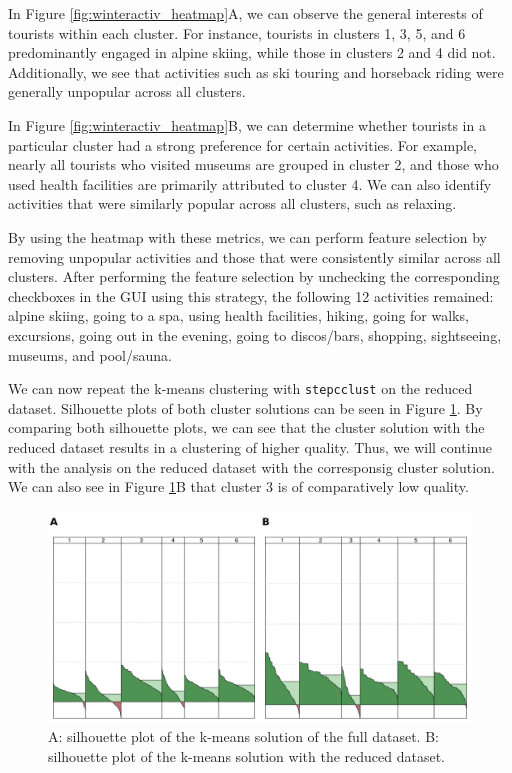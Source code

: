 \documentclass[article]{ajs}
\begin{document}
In Figure \ref{fig:winteractiv_heatmap}A, we can observe the general interests of tourists within each cluster. For instance, tourists in clusters 1, 3, 5, and 6 predominantly engaged in alpine skiing, while those in clusters 2 and 4 did not. Additionally, we see that activities such as ski touring and horseback riding were generally unpopular across all clusters.

In Figure \ref{fig:winteractiv_heatmap}B, we can determine whether tourists in a particular cluster had a strong preference for certain activities. For example, nearly all tourists who visited museums are grouped in cluster 2, and those who used health facilities are primarily attributed to cluster 4. We can also identify activities that were similarly popular across all clusters, such as relaxing.

By using the heatmap with these metrics, we can perform feature selection by removing unpopular activities and those that were consistently similar across all clusters. After performing the feature selection by unchecking the corresponding checkboxes in the GUI using this strategy, the following 12 activities remained: alpine skiing, going to a spa, using health facilities, hiking, going for walks, excursions, going out in the evening, going to discos/bars, shopping, sightseeing, museums, and pool/sauna.

We can now repeat the k-means clustering with \texttt{stepcclust} on the reduced dataset. Silhouette plots of both cluster solutions can be seen in Figure \ref{fig:silhouette_comparison}. By comparing both silhouette plots, we can see that the cluster solution with the reduced dataset results in a clustering of higher quality. Thus, we will continue with the analysis on the reduced dataset with the corresponsig cluster solution. We can also see in Figure \ref{fig:silhouette_comparison}B that cluster 3 is of comparatively low quality.

\begin{figure}[h!]
    \centering
    \includegraphics[width=1\textwidth]{silhouette_comparison.png}
    \caption{A: silhouette plot of the k-means solution of the full dataset. B: silhouette plot of the k-means solution with the reduced dataset.}
    \label{fig:silhouette_comparison}
\end{figure}
\end{document}
